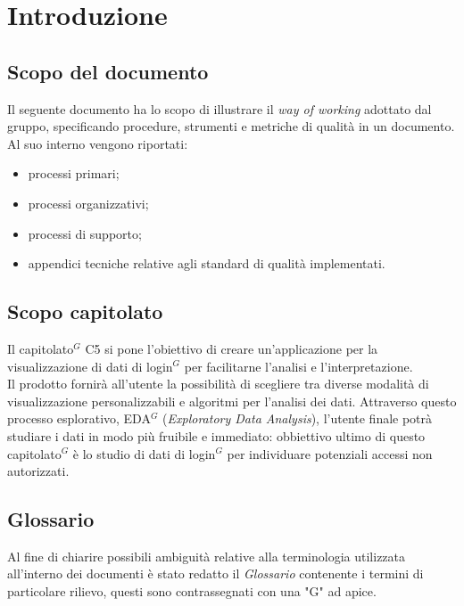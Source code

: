 \section{Introduzione}
\subsection{Scopo del documento}

Il seguente documento ha lo scopo di illustrare il \textit{way of working} adottato dal gruppo, specificando procedure, strumenti e metriche di qualità in un documento.
Al suo interno vengono riportati:
\begin{itemize}
    \item processi primari;
    \item processi organizzativi;
    \item processi di supporto;
    \item appendici tecniche relative agli standard di qualità implementati.
\end{itemize}

\subsection{Scopo capitolato}
Il capitolato$^{G}$ C5 si pone l'obiettivo di creare un'applicazione per la visualizzazione di dati
di login$^{G}$ per facilitarne l'analisi e l'interpretazione.\\
Il prodotto fornirà all'utente la possibilità di scegliere tra diverse modalità di visualizzazione personalizzabili 
e algoritmi per l'analisi dei dati. Attraverso questo processo esplorativo, EDA$^{G}$ (\textit{Exploratory Data Analysis}), 
l'utente finale potrà studiare i dati in modo più fruibile e immediato: obbiettivo ultimo di questo capitolato$^{G}$ 
è lo studio di dati di login$^{G}$ per individuare potenziali accessi non autorizzati.

\subsection{Glossario}
Al fine di chiarire possibili ambiguità relative alla terminologia utilizzata all'interno dei
documenti è stato redatto il \textit{Glossario} contenente i termini di particolare rilievo, questi
sono contrassegnati con una "G" ad apice.
\newpage